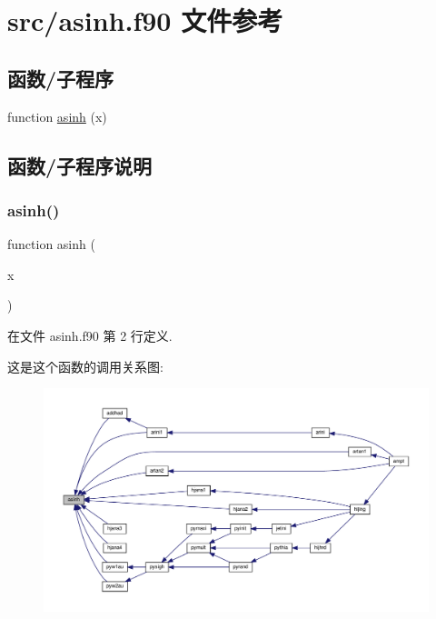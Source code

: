 \hypertarget{asinh_8f90}{}\section{src/asinh.f90 文件参考}
\label{asinh_8f90}
\subsection*{函数/子程序}
\begin{DoxyCompactItemize}
\item 
function \mbox{\hyperlink{asinh_8f90_a931bfc127697c783bc674f700e1e7a87}{asinh}} (x)
\end{DoxyCompactItemize}


\subsection{函数/子程序说明}
\mbox{\label{asinh_8f90_a931bfc127697c783bc674f700e1e7a87}} 
\subsubsection{\texorpdfstring{asinh()}{asinh()}}
{\footnotesize\ttfamily function asinh (\begin{DoxyParamCaption}\item[{}]{x }\end{DoxyParamCaption})}



在文件 asinh.\+f90 第 2 行定义.

这是这个函数的调用关系图\+:
\nopagebreak
\begin{figure}[H]
\begin{center}
\leavevmode
\includegraphics[width=350pt]{asinh_8f90_a931bfc127697c783bc674f700e1e7a87_icgraph}
\end{center}
\end{figure}
